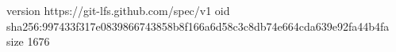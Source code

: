 version https://git-lfs.github.com/spec/v1
oid sha256:997433f317e0839866743858b8f166a6d58c3c8db74e664cda639e92fa44b4fa
size 1676
